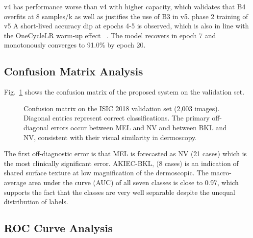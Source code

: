 \documentclass[conference]{IEEEtran}
\begin{document}
v4 has performance worse than v4 with higher capacity, which validates that B4 overfits at 8 samples/k as well as justifies the use of B3 in v5. phase 2 training of v5 A short-lived accuracy dip at epochs 4-5 is observed, which is also in line with the OneCycleLR warm-up effect ~\cite{smith2019superconvergence}. The model recovers in epoch 7 and monotonously converges to 91.0\% by epoch 20.

\subsection{Confusion Matrix Analysis}

Fig.~\ref{fig:confusion_matrix} shows the confusion matrix of the proposed system on the validation set.

\begin{figure}[htbp]
\centering
{}
\caption{Confusion matrix on the ISIC 2018 validation set (2,003 images). Diagonal entries represent correct classifications. The primary off-diagonal errors occur between MEL and NV and between BKL and NV, consistent with their visual similarity in dermoscopy.}
\label{fig:confusion_matrix}
\end{figure}

\FloatBarrier

The first off-diagnostic error is that MEL is forecasted as NV (21 cases) which is the most clinically significant error. AKIEC-BKL, (8 cases) is an indication of shared surface texture at low magnification of the dermoscopic. The macro-average area under the curve (AUC) of all seven classes is close to 0.97, which supports the fact that the classes are very well separable despite the unequal distribution of labels.

\subsection{ROC Curve Analysis}
\end{document}
